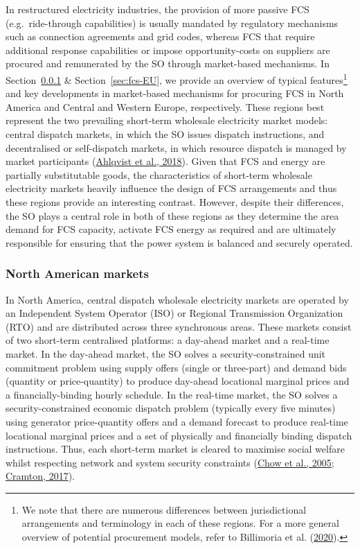\documentclass[12pt,a4paper,]{report}
\begin{document}
In restructured electricity industries, the provision of more passive
FCS (e.g.~ride-through capabilities) is usually mandated by regulatory
mechanisms such as connection agreements and grid codes, whereas FCS
that require additional response capabilities or impose
opportunity-costs on suppliers are procured and remunerated by the SO
through market-based mechanisms. In Section~\ref{sec:fcs-NA} \&
Section~\ref{sec:fcs-EU}, we provide an overview of typical
features\footnote{We note that there are numerous differences between
  jurisdictional arrangements and terminology in each of these regions.
  For a more general overview of potential procurement models, refer to
  Billimoria et al.
  (\protect\hyperlink{ref-billimoriaMarketDesignSystem2020}{2020}).} and
key developments in market-based mechanisms for procuring FCS in North
America and Central and Western Europe, respectively. These regions best
represent the two prevailing short-term wholesale electricity market
models: central dispatch markets, in which the SO issues dispatch
instructions, and decentralised or self-dispatch markets, in which
resource dispatch is managed by market participants
(\protect\hyperlink{ref-ahlqvistCentralSelfDispatchElectricity2018}{Ahlqvist
et al., 2018}). Given that FCS and energy are partially substitutable
goods, the characteristics of short-term wholesale electricity markets
heavily influence the design of FCS arrangements and thus these regions
provide an interesting contrast. However, despite their differences, the
SO plays a central role in both of these regions as they determine the
area demand for FCS capacity, activate FCS energy as required and are
ultimately responsible for ensuring that the power system is balanced
and securely operated.

\hypertarget{sec:fcs-NA}{%
\subsubsection{North American markets}\label{sec:fcs-NA}}

In North America, central dispatch wholesale electricity markets are
operated by an Independent System Operator (ISO) or Regional
Transmission Organization (RTO) and are distributed across three
synchronous areas. These markets consist of two short-term centralised
platforms: a day-ahead market and a real-time market. In the day-ahead
market, the SO solves a security-constrained unit commitment problem
using supply offers (single or three-part) and demand bids (quantity or
price-quantity) to produce day-ahead locational marginal prices and a
financially-binding hourly schedule. In the real-time market, the SO
solves a security-constrained economic dispatch problem (typically every
five minutes) using generator price-quantity offers and a demand
forecast to produce real-time locational marginal prices and a set of
physically and financially binding dispatch instructions. Thus, each
short-term market is cleared to maximise social welfare whilst
respecting network and system security constraints
(\protect\hyperlink{ref-chowElectricityMarketDesign2005}{Chow et al.,
2005};
\protect\hyperlink{ref-cramtonElectricityMarketDesign2017}{Cramton,
2017}).
\end{document}
